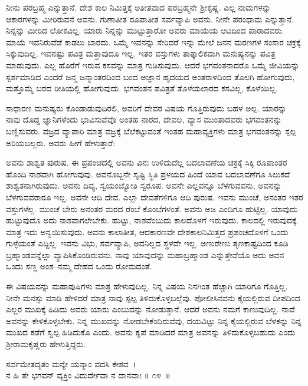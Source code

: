 ನೀನು ಪರಬ್ರಹ್ಮ ಎನ್ನುತ್ತಾನೆ. ದೇಶ ಕಾಲ ನಿಮಿತ್ತಕ್ಕೆ ಅತೀತವಾದ ಪರಬ್ರಹ್ಮನೇ ಶ‍್ರೀಕೃಷ್ಣ. ಎಲ್ಲ ನಾಮಗಳನ್ನು ಆಕಾರಗಳನ್ನು ಮೀರಿರುವನೆ ಅವನು. ಗುಣಾತೀತ ರೂಪಾತೀತ ಸರ್ವವ್ಯಾಪಿ ಅವನು. ನೀನೇ ಪರಂಧಾಮ ಎನ್ನುತ್ತಾನೆ. ನಿನ್ನನ್ನು ಮೀರಿದ ಲೋಕವಿಲ್ಲ. ಯಾರು ನಿನ್ನನ್ನು ಮುಟ್ಟುತ್ತಾರೋ ಅವರು ಮಾಯೆಯ ಆಟದಿಂದ ಪಾರಾದವರು. ಮಾಯೆ ಇವನಿರುವೆಡೆ ಕಾಡಲು ಬಾರದು. ಒಮ್ಮೆ ಇವನನ್ನು ಸೇರಿದರೆ ಇನ್ನು ಮೇಲೆ ಜನನ ಮರಣಗಳ ಸಂಸಾರ ಚಕ್ರಕ್ಕೆ ಸಿಕ್ಕುವುದಿಲ್ಲ. ಇವನಷ್ಟು ಪವಿತ್ರ ಮತ್ತಾವುದೂ ಇಲ್ಲ. ಇತರ ವಸ್ತುಗಳು ತಾತ್ಕಾಲಿಕವಾಗಿ ಮನುಷ್ಯನನ್ನು ಪವಿತ್ರ ಮಾಡುವುದು. ಎಲ್ಲ ಹೊರೆಗೆ ಇರುವ ಕಸವನ್ನು ಮಾತ್ರ ಗುಡಿಸುವುದು. ಆದರೆ ಭಗವಂತನಾದರೊ ಒಮ್ಮೆ ಜೀವಿಯನ್ನು ಸ್ಪರ್ಶಮಾಡಿದ ಎಂದರೆ ಜನ್ಮ ಜನ್ಮಾಂತರದಿಂದ ಬಂದ ಅಜ್ಞಾನ ಹೃದಯದ ಅಂತರಾಳದಿಂದ ತೊಲಗಿ ಹೋಗುವುದು, ಮತ್ತೊಮ್ಮೆ ಬರದ ರೀತಿಯಲ್ಲಿ ಹೋಗುವುದು. ಭಗವಂತನ ಪವಿತ್ರತೆ ತೊಳೆಯಲಾರದ ಕಸವಿಲ್ಲ, ಕೊಳೆಯಿಲ್ಲ.

ಸಾಧಾರಣ ಮನುಷ್ಯರು ಕೊಂಡಾಡುವುದಿರಲಿ, ಅವರಿಗೆ ದೇವರ ವಿಷಯ ಗೊತ್ತಿರುವುದು ಬಹಳ ಅಲ್ಪ. ಯಾರನ್ನು ನಾವು ದೊಡ್ಡ ಜ್ಞಾನಿಗಳೆಂದು ಭಾವಿಸುವೆವೊ ಅಂತಹ ನಾರದ, ದೇವಲ, ವ್ಯಾಸ ಮುಂತಾದವರು ಭಗವಂತನನ್ನು ಬಣ್ಣಿಸುವರು. ವಜ್ರದ ವ್ಯಾಪಾರಿ ಮಾತ್ರ ವಜ್ರಕ್ಕೆ ಬೆಲೆಕಟ್ಟುವಂತೆ ಇಂತಹ ಮಹಾವ್ಯಕ್ತಿಗಳು ಮಾತ್ರ ಭಗವಂತನನ್ನು ಸ್ಪಲ್ಪ ಅರಿಯಬಲ್ಲರು. ಅವರು ಹೀಗೆ ಹೇಳುತ್ತಾರೆ:

ಅವನು ಶಾಶ್ವತ ಪುರುಷ. ಈ ಪ್ರಪಂಚದಲ್ಲಿ ಅವನು ವಿನಃ ಉಳಿದುದೆಲ್ಲ ಬದಲಾವಣೆಯ ಚಕ್ರಕ್ಕೆ ಸಿಕ್ಕಿ ರೂಪಾಂತರ ಹೊಂದಿ ನಾಶವಾಗಿ ಹೋಗುವುವು. ಅವನೊಬ್ಬನೇ ಸೃಷ್ಟಿ ಸ್ಥಿತಿ ಪ್ರಳಯದ ಹಿಂದೆ ಯಾವ ಬದಲಾವಣೆಗೂ ಸಿಲುಕದೆ ಶಾಶ್ವತನಾಗಿರುವುದು. ಅವನು ದಿವ್ಯ, ಸ್ವಯಂಜ್ಯೋತಿ ಸ್ವರೂಪ. ಅವನೇ ಎಲ್ಲವನ್ನೂ ಬೆಳಗುವವನು, ಅವನನ್ನು ಬೆಳಗುವವರಾರೂ ಇಲ್ಲ. ಅವನೇ ಆದಿ ದೇವ. ಎಲ್ಲಾ ದೇವತೆಗಳಿಗೂ ಆದಿ ಪುರುಷ. ಇವನು ಮುಂಚೆ, ಅನಂತರ ಇತರ ವಸ್ತುಗಳೆಲ್ಲ. ಮುಂಚೆ ಬೇರು ಅನಂತರ ಮರದ ರೆಂಬೆ ಕೊಂಬೆಗಳಂತೆ. ಅವನು ಅಜ ಎಂದಿಗೂ ಹುಟ್ಟಿಲ್ಲ. ಯಾವುದು ಹುಟ್ಟುವುದೊ ಅದು ನಾಶವಾಗಲೇಬೇಕು. ಹುಟ್ಟು, ನಾಶವೆಂಬುದು ಕಾಲದೊಳಗೆ ಇರುವುದು. ಕಾಲದಲ್ಲಿ ಇರುವುದಕ್ಕೆ ಮಾತ್ರ ಇದು ಅನ್ವಯಿಸುವುದು. ಅವನು ಕಾಲಾತೀತ, ಆದಕಾರಣವೇ ದೇಶಕಾಲನಿಮಿತ್ತದ ಪ್ರಪಂಚದೊಳಗೆ ಒಂದು ಗುಳ್ಳೆಯಂತೆ ಎದ್ದಿಲ್ಲ. ಇವನು ವಿಭು, ಸರ್ವವ್ಯಾಪಿ, ಅವನಿಲ್ಲದ ಸ್ಥಳವೇ ಇಲ್ಲ. ಅಣುರೇಣು ತೃಣಕಾಷ್ಟದಿಂದ ಕೂಡಿ ಬ್ರಹ್ಮಾಂಡವನ್ನೆಲ್ಲಾ ವ್ಯಾಪಿಸಿಕೊಂಡಿರುವನು. ನಾವು ಯಾವುದನ್ನು ಮಹಾಬ್ರಹ್ಮಾಂಡ ಎನ್ನುತ್ತೇವೆಯೊ ಅದು ಅವನ ಒಂದು ಸಣ್ಣ ಅಂಶ–ನಮ್ಮ ದೇಹದ ಒಂದು ರೋಮದಂತೆ.

ಈ ವಿಷಯವನ್ನು ಮಹಾಪುಷಿಗಳು ಮಾತ್ರ ಹೇಳುವುದಿಲ್ಲ. ನಿನ್ನ ವಿಷಯ ನಿನಗಿಂತ ಹೆಚ್ಚಾಗಿ ಯಾರಿಗೂ ಗೊತ್ತಿಲ್ಲ. ನೀನೇ ಮನಸ್ಸು ಮಾಡಿ ಹೇಳಿದರೆ ಮಾತ್ರ ನಾವು ಸ್ಪಲ್ಪ ತಿಳಿದುಕೊಳ್ಳಬಲ್ಲೆವು. ಪೋಲೀಸಿನವನು ಕೈಯಲ್ಲಿರುವ ದೀಪದಿಂದ ಎಲ್ಲರ ಮುಖಕ್ಕೆ ಹಿಡಿದು ಅವರು ಯಾರು ಎಂಬು\-ದನ್ನು ನೋಡುತ್ತಾನೆ. ಆದರೆ ಅವನು ನಮಗೆ ಕಾಣುವುದಿಲ್ಲ. ನಾವೆ ಅವನನ್ನು ಕೇಳಿಕೊಳ್ಳಬೇಕು. ನಿನ್ನ ಮುಖವನ್ನು ನೋಡಬೇಕೆಂದಿರುವೆವು, ದಯವಿಟ್ಟು ನಿನ್ನ ಕೈಯಲ್ಲಿರುವ ಬೆಳಕನ್ನು ನಿನ್ನ ಮುಖದ ಕಡೆಗೆ ಸ್ವಲ್ಪ ಹಿಡಿದುಕೊ ಎಂದು. ಅವನು ಕೃಪೆ ಮಾಡಿದರೆ ಮಾತ್ರ ಅವನನ್ನು ತಿಳಿದುಕೊಳ್ಳಬಹುದು ಎಂದು ಶ‍್ರೀರಾಮಕೃಷ್ಣರು ಹೇಳುತ್ತಿದ್ದರು.

\begin{shloka}
ಸರ್ವಮೇತದೃತಂ ಮನ್ಯೇ ಯನ್ಮಾಂ ವದಸಿ ಕೇಶವ~।\\ನ ಹಿ ತೇ ಭಗವನ್ ವ್ಯಕ್ತಿಂ ವಿದುರ್ದೇವಾ ನ ದಾನವಾಃ \hfill॥ ೧೪~॥
\end{shloka}

